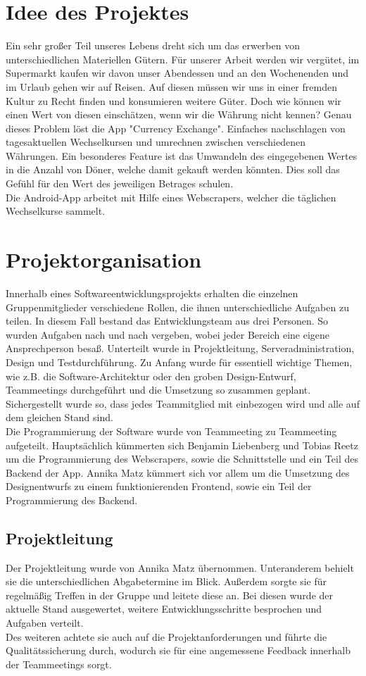 \documentclass[conference]{IEEEtran}
\begin{document}
\section{Idee des Projektes}
Ein sehr großer Teil unseres Lebens dreht sich um das erwerben von unterschiedlichen Materiellen Gütern. Für unserer Arbeit werden wir vergütet, im Supermarkt kaufen wir davon unser Abendessen und an den Wochenenden und im Urlaub gehen wir auf Reisen. Auf diesen müssen wir uns in einer fremden Kultur zu Recht finden und konsumieren weitere Güter. Doch wie können wir einen Wert von diesen einschätzen, wenn wir die Währung nicht kennen? Genau dieses Problem löst die App "Currency Exchange". Einfaches nachschlagen von tagesaktuellen Wechselkursen und umrechnen zwischen verschiedenen Währungen. Ein besonderes Feature ist das Umwandeln des eingegebenen Wertes in die Anzahl von Döner, welche damit gekauft werden könnten. Dies soll das Gefühl für den Wert des jeweiligen Betrages schulen.\\
Die  Android-App arbeitet mit Hilfe eines Webscrapers, welcher die täglichen Wechselkurse sammelt.


\section{Projektorganisation}
Innerhalb eines Softwareentwicklungsprojekts erhalten die einzelnen Gruppenmitglieder verschiedene Rollen, die ihnen unterschiedliche Aufgaben zu teilen. In diesem Fall bestand das Entwicklungsteam aus drei Personen. So wurden Aufgaben nach und nach vergeben, wobei jeder Bereich eine eigene Ansprechperson besaß. Unterteilt wurde in Projektleitung, Serveradministration, Design und Testdurchführung. Zu Anfang wurde für essentiell wichtige Themen, wie z.B. die Software-Architektur oder den groben Design-Entwurf, Teammeetings durchgeführt und die Umsetzung so zusammen geplant. Sichergestellt wurde so, dass jedes Teammitglied mit einbezogen wird und alle auf dem gleichen Stand sind. \\
Die Programmierung der Software wurde von Teammeeting zu Teammeeting aufgeteilt. Hauptsächlich kümmerten sich Benjamin Liebenberg und Tobias Reetz um die Programmierung des Webscrapers, sowie die Schnittstelle und ein Teil des Backend der App. Annika Matz kümmert sich vor allem um die Umsetzung des Designentwurfs zu einem funktionierenden Frontend, sowie ein Teil der Programmierung des Backend.

\subsection{Projektleitung}
Der Projektleitung wurde von Annika Matz übernommen. Unteranderem behielt sie die unterschiedlichen Abgabetermine im Blick. Außerdem sorgte sie für regelmäßig Treffen in der Gruppe und leitete diese an. Bei diesen wurde der aktuelle Stand ausgewertet, weitere Entwicklungsschritte besprochen und Aufgaben verteilt. \\
Des weiteren achtete sie auch auf die Projektanforderungen und führte die Qualitätssicherung durch, wodurch sie für eine angemessene Feedback innerhalb der Teammeetings sorgt.
\end{document}
